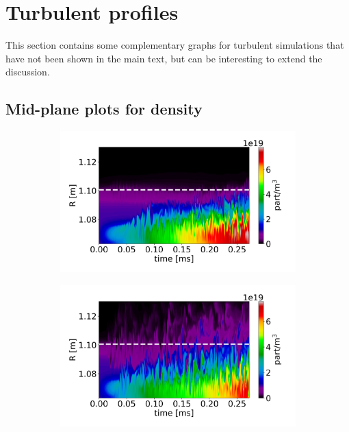 \chapter{Turbulent profiles}
\label{app:turbulentProfiles}

This section contains some complementary graphs for turbulent simulations that have not been shown in the main text, but can be interesting to extend the discussion. 

\section{Mid-plane plots for density}
\label{sec:turbulentProfiles_CIRC}

\begin{figure}[H]\centering
	\begin{subfigure}[t]{0.45\textwidth}
		\centering
		\includegraphics[width=1\textwidth]{schemes/plotOMPtime_spec1_n_PHI.jpg}
	\end{subfigure}
	\begin{subfigure}[t]{0.45\textwidth}
		\centering
		\includegraphics[width=1\textwidth]{schemes/plotOMPtime_spec1_n_PHIJ_mass_1.jpg}

\end{subfigure}
\end{figure}
